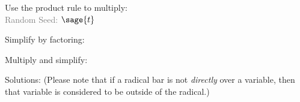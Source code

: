 \documentclass{article}%
\begin{document}

\noindent Use the product rule to multiply: \\
\textcolor{gray}{Random Seed: $\sage{t}$}


\begin{enumerate}

\begin{multicols}{3}
\end{multicols}

\noindent Simplify by factoring: 
\begin{multicols}{3}

\end{multicols}

\noindent Multiply and simplify:
\begin{multicols}{3}
\end{multicols}
\end{enumerate}


\newpage 

\noindent Solutions: (Please note that if a radical bar is not \emph{directly} over a variable, then that variable is considered to be outside of the radical.) \\


\begin{multicols}{3}
\begin{enumerate}
\end{enumerate}
\end{multicols}
\end{document}
